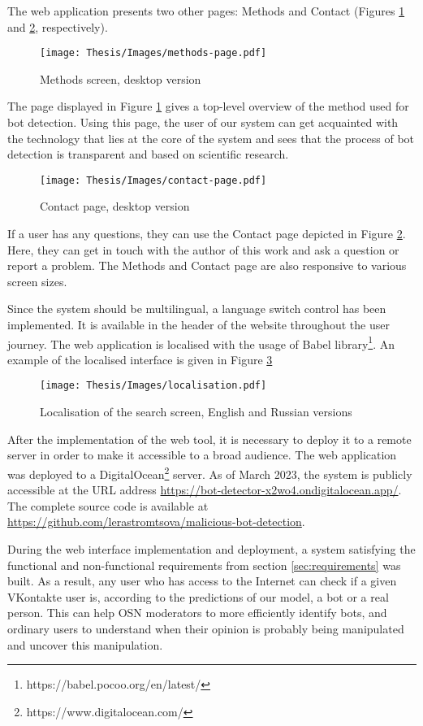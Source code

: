 The web application presents two other pages: Methods and Contact (Figures \ref{fig:methods-page} and \ref{fig:contact-page}, respectively).

\begin{figure}
	\centering
	\texttt{[image: Thesis/Images/methods-page.pdf]}
	\caption{Methods screen, desktop version}
	\label{fig:methods-page}
\end{figure}

The page displayed in Figure \ref{fig:methods-page} gives a top-level overview of the method used for bot detection. Using this page, the user of our system can get acquainted with the technology that lies at the core of the system and sees that the process of bot detection is transparent and based on scientific research.

\begin{figure}
	\centering
	\texttt{[image: Thesis/Images/contact-page.pdf]}
	\caption{Contact page, desktop version}
	\label{fig:contact-page}
\end{figure}

If a user has any questions, they can use the Contact page depicted in Figure \ref{fig:contact-page}. Here, they can get in touch with the author of this work and ask a question or report a problem. The Methods and Contact page are also responsive to various screen sizes.

Since the system should be multilingual, a language switch control has been implemented. It is available in the header of the website throughout the user journey. The web application is localised with the usage of Babel library\footnote{https://babel.pocoo.org/en/latest/}. An example of the localised interface is given in Figure \ref{fig:localisation}

\begin{figure}
	\centering
	\texttt{[image: Thesis/Images/localisation.pdf]}
	\caption{Localisation of the search screen, English and Russian versions}
	\label{fig:localisation}
\end{figure}

After the implementation of the web tool, it is necessary to deploy it to a remote server in order to make it accessible to a broad audience. The web application was deployed to a DigitalOcean\footnote{https://www.digitalocean.com/} server. As of March 2023, the system is publicly accessible at the URL address \url{https://bot-detector-x2wo4.ondigitalocean.app/}. The complete source code is available at \url{https://github.com/lerastromtsova/malicious-bot-detection}.

During the web interface implementation and deployment, a system satisfying the functional and non-functional requirements from section \ref{sec:requirements} was built. As a result, any user who has access to the Internet can check if a given VKontakte user is, according to the predictions of our model, a bot or a real person. This can help OSN moderators to more efficiently identify bots, and ordinary users to understand when their opinion is probably being manipulated and uncover this manipulation.
